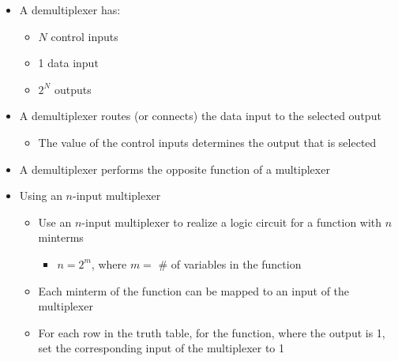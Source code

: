 \begin{itemize}

  \item A demultiplexer has:

    \begin{itemize}

      \item $N$ control inputs

      \item 1 data input

      \item $2^N$ outputs

    \end{itemize}

  \item A demultiplexer routes (or connects) the data input to the selected output

    \begin{itemize}

      \item The value of the control inputs determines the output that is selected

    \end{itemize}

  \item A demultiplexer performs the opposite function of a multiplexer

  \item Using an $n$-input multiplexer

    \begin{itemize}

      \item Use an $n$-input multiplexer to realize a logic circuit for a function with $n$ minterms

        \begin{itemize}

          \item $n=2^m$, where $m=$ \# of variables in the function

        \end{itemize}

      \item Each minterm of the function can be mapped to an input of the multiplexer

      \item For each row in the truth table, for the function, where the output is 1, set the corresponding input of the multiplexer to 1

        \begin{itemize}


\end{itemize}
\end{itemize}
\end{itemize}
